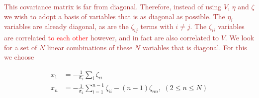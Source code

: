 \documentclass[12pt]{article}
\newcommand{\SH}[1]{\textcolor{brown}{[{\bf SH}: #1]}}
\newcommand{\sh}[1]{\textcolor{brown}{#1}}
\newcommand{\LFL}[1]{\textcolor{red}{#1}}
\begin{document}


%
\sh{This covariance matrix is far from diagonal. Therefore, instead of using $V$, $\eta$ and $\zeta$ we wish to adopt a basis of variables that is as diagonal as possible. The $\eta_i$ variables are already diagonal, as are the $\zeta_{ij}$ terms with $i\neq j$. The $\zeta_{ii}$ variables are correlated \LFL{to each other} however, and in fact are also correlated to $V$. We look for a set of $N$ linear combinations of these $N$ variables that is diagonal. For this we choose}

%
\begin{align}
\label{BasisTransform}
x_1 &= -\frac{1}{\sigma_2}\sum_i\zeta_{ii} \nonumber \\
x_n &= -\frac{1}{\sigma_2}\sum_{i=1}^{n-1}\zeta_{ii}-(n-1)\zeta_{nn},\,\, (2\leq n \leq N)
\end{align}
%
\end{document}
